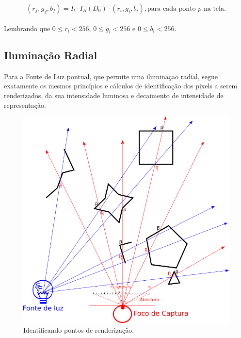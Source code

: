 \documentclass{article}
\begin{document}
	\begin{equation}
		(r_f, g_f, b_f) = I_t \cdot I_R(D_0) \cdot (r_i, g_i, b_i), \text{para cada ponto $p$ na tela}.
	\end{equation}
	
	\paragraph{}
	Lembrando que $0 \le r_i < 256$, $0 \le g_i < 256$ e $0 \le b_i < 256$.
	
	\subsection{Iluminação Radial}
	
	\paragraph{} 
	Para a Fonte de Luz pontual, que permite uma iluminaçao radial, segue exatamente os mesmos princípios e cálculos de identificação dos pixels a serem renderizados, da sua intensidade luminosa e decaimento de intensidade de representação. 
	
	\begin{figure}[h]
		\centering
		\includegraphics[scale=0.8]{Renderizacao-2D-1D-radial}
		\caption{Identificando pontos de renderização.}
		\label{fig:rend-rad}
	\end{figure}
	
\end{document}

